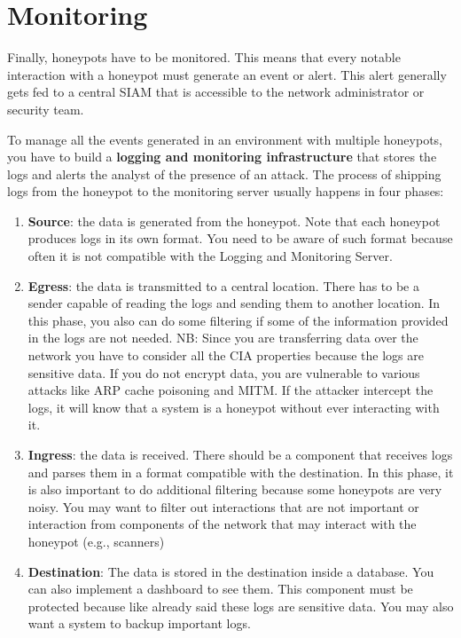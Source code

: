\documentclass[epsfig,a4paper,11pt,titlepage,oneside,openany]{book}
\begin{document}
\section{Monitoring}

Finally, honeypots have to be monitored. This means that every notable interaction with a honeypot must generate an event or alert. This alert generally gets fed to a central SIAM that is accessible to the network administrator or security team.

To manage all the events generated in an environment with multiple honeypots, you have to build a \textbf{logging and monitoring infrastructure} that stores the logs and alerts the analyst of the presence of an attack. The process of shipping logs from the honeypot to the monitoring server usually happens in four phases:
\begin{enumerate}
\item \textbf{Source}: the data is generated from the honeypot. Note that each honeypot produces logs in its own format. You need to be aware of such format because often it is not compatible with the Logging and Monitoring Server.
\item \textbf{Egress}: the data is transmitted to a central location. There has to be a sender capable of reading the logs and sending them to another location. In this phase, you also can do some filtering  if some of the information provided in the logs are not needed.
NB: Since you are transferring data over the network you have to consider all the CIA properties because the logs are sensitive data. If you do not encrypt data, you are vulnerable to various attacks like ARP cache poisoning and MITM. If the attacker intercept the logs, it will know that a system is a honeypot without ever interacting with it.
\item	\textbf{Ingress}: the data is received. There should be a component that receives logs and parses them in a format compatible with the destination. In this phase, it is also important to do additional filtering because  some honeypots are very noisy. You may want to filter out interactions that are not important or interaction from components of the network that may interact with the honeypot (e.g., scanners)
\item \textbf{Destination}: The data is stored in the destination inside a database.  You can also implement a dashboard to see them. This component must be protected because like already said these logs are sensitive data. You may also want a system to backup important logs.
\end{enumerate}
\end{document}
